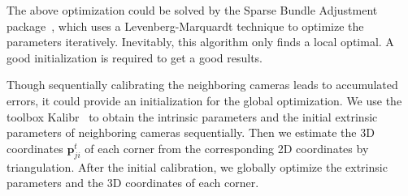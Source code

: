 The above optimization could be solved by the Sparse Bundle Adjustment package~\cite{lour09}, which uses a Levenberg-Marquardt technique to optimize the parameters iteratively.
Inevitably, this algorithm only finds a local optimal.
A good initialization is required to get a good results.


Though sequentially calibrating the neighboring cameras leads to accumulated errors, it could provide an initialization for the global optimization.
%
We use the toolbox Kalibr~\cite{Maye2013Self} to obtain the intrinsic parameters and the initial extrinsic parameters of neighboring cameras sequentially.
%
Then we estimate the 3D coordinates $\mathbf{p}^{t}_{ji}$ of each corner from the corresponding 2D coordinates by triangulation.
%
After the initial calibration, we globally optimize the extrinsic parameters and the 3D coordinates of each corner.


